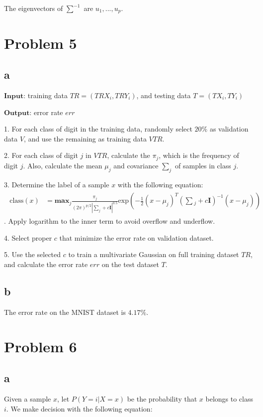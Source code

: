 \documentclass[a4paper,11pt]{article}
\theoremstyle{mytheor}
\begin{document}
The eigenvectors of $\sum^{-1}$ are $u_1, ..., u_p$.

\section*{Problem 5}
\subsection*{a}

$\mathbf{Input}$: training data $TR = (TRX_i, TRY_i)$, and testing data $T = (TX_i, TY_i)$

$\mathbf{Output}$: error rate $err$

1. For each class of digit in the training data, randomly select $20\%$ as validation data $V$, and use the remaining as training data $VTR$.

2. For each class of digit $j$ in $VTR$, calculate the $\pi_j$, which is the frequency of digit $j$. Also, calculate the mean $\mu_j$ and covariance $\sum_{j}$ of samples in class $j$.

3. Determine the label of a sample $x$ with the following equation:
\begin{align}
	\begin{split}
	\text{class}(x) &= \mathbf{max}_{j} \frac{\pi_j}{(2\pi)^{p/2} |\sum_j + c\mathbf{I}|^{0.5}}
	\text{exp}(-\frac{1}{2} (x - \mu_j)^T (\sum{}_j + c\mathbf{I})^{-1} (x - \mu_j))
	\end{split}
\end{align}.
Apply logarithm to the inner term to avoid overflow and underflow.

4. Select proper $c$ that minimize the error rate on validation dataset.

5. Use the selected $c$ to train a multivariate Gaussian on full training dataset $TR$, and calculate the error rate $err$ on the test dataset $T$.

\subsection*{b}
The error rate on the MNIST dataset is $4.17\%$.

\section*{Problem 6}
\subsection*{a}
Given a sample $x$, let
$P(Y = i | X = x)$ be the probability that $x$ belongs to class $i$. We make decision with the following equation:
\end{document}
